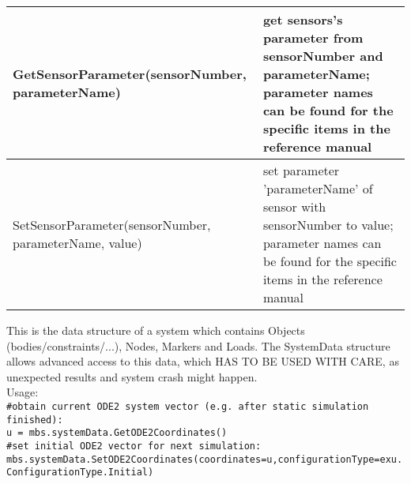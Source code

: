\begin{center}
\begin{longtable}{| p{8cm} | p{8cm} |}
  GetSensorParameter(sensorNumber, parameterName) & get sensors's parameter from sensorNumber and parameterName; parameter names can be found for the specific items in the reference manual\\ \hline 
  SetSensorParameter(sensorNumber, parameterName, value) & set parameter 'parameterName' of sensor with sensorNumber to value; parameter names can be found for the specific items in the reference manual\\ \hline 
\end{longtable}
\end{center}

This is the data structure of a system which contains Objects (bodies/constraints/...), Nodes, Markers and Loads. The SystemData structure allows advanced access to this data, which HAS TO BE USED WITH CARE, as unexpected results and system crash might happen. \\ 
 Usage: \\ \small 
\texttt{\#obtain current ODE2 system vector (e.g. after static simulation finished): \\ u = mbs.systemData.GetODE2Coordinates() \\ \#set initial ODE2 vector for next simulation:\\ 
mbs.systemData.SetODE2Coordinates(coordinates=u,configurationType=exu.ConfigurationType.Initial)}


